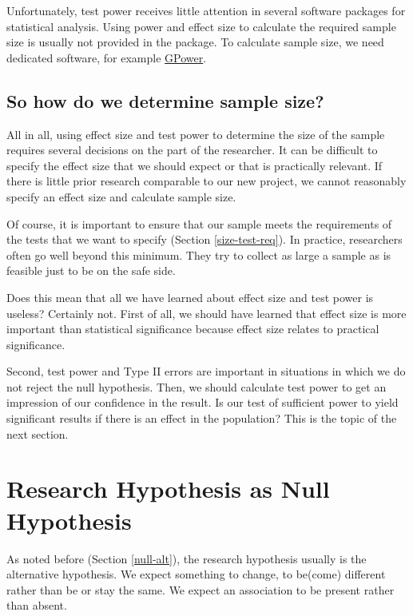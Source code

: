 \documentclass[a4paper]{book}
\theoremstyle{definition}
\theoremstyle{definition}
\theoremstyle{definition}
\theoremstyle{remark}
\begin{document}
Unfortunately, test power receives little attention in several software
packages for statistical analysis. Using power and effect size to
calculate the required sample size is usually not provided in the
package. To calculate sample size, we need dedicated software, for
example \href{http://www.gpower.hhu.de/}{GPower}.

\subsection{So how do we determine sample
size?}\label{so-how-do-we-determine-sample-size}

All in all, using effect size and test power to determine the size of
the sample requires several decisions on the part of the researcher. It
can be difficult to specify the effect size that we should expect or
that is practically relevant. If there is little prior research
comparable to our new project, we cannot reasonably specify an effect
size and calculate sample size.

Of course, it is important to ensure that our sample meets the
requirements of the tests that we want to specify (Section
\ref{size-test-req}). In practice, researchers often go well beyond this
minimum. They try to collect as large a sample as is feasible just to be
on the safe side.

Does this mean that all we have learned about effect size and test power
is useless? Certainly not. First of all, we should have learned that
effect size is more important than statistical significance because
effect size relates to practical significance.

Second, test power and Type II errors are important in situations in
which we do not reject the null hypothesis. Then, we should calculate
test power to get an impression of our confidence in the result. Is our
test of sufficient power to yield significant results if there is an
effect in the population? This is the topic of the next section.

\section{Research Hypothesis as Null
Hypothesis}\label{research-hypothesis-as-null-hypothesis}

As noted before (Section \ref{null-alt}), the research hypothesis
usually is the alternative hypothesis. We expect something to change, to
be(come) different rather than be or stay the same. We expect an
association to be present rather than absent.
\end{document}
